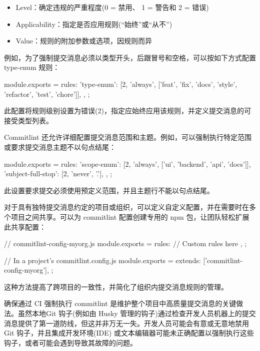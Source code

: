 \begin{itemize}
\item
Level：确定违规的严重程度(0 = 禁用、 1 = 警告和 2 = 错误)

\item
Applicability：指定是否应用规则(“始终”或“从不”)

\item
Value：规则的附加参数或选项，因规则而异
\end{itemize}

例如，为了强制提交消息必须以类型开头，后跟冒号和空格，可以按如下方式配置 type-enum 规则：

\begin{shell}
module.exports = {
    rules: {
        'type-enum': [2, 'always', ['feat', 'fix', 'docs', 'style',
        'refactor', 'test', 'chore']],
    },
};
\end{shell}

此配置将规则级别设置为错误(2)，指定应始终应用该规则，并定义提交消息的可接受类型列表。


Commitlint 还允许详细配置提交消息范围和主题。例如，可以强制执行特定范围或要求提交消息主题不以句点结尾：

\begin{shell}
module.exports = {
    rules: {
        'scope-enum': [2, 'always', ['ui', 'backend', 'api', 'docs']],
        'subject-full-stop': [2, 'never', '.'],
    },
};
\end{shell}

此设置要求提交必须使用预定义范围，并且主题行不能以句点结尾。


对于具有独特提交消息约定的项目或组织，可以定义自定义配置，并在需要时在多个项目之间共享。可以为 commitlint 配置创建专用的 npm 包，让团队轻松扩展此共享配置：

\begin{shell}
// commitlint-config-myorg.js
module.exports = {
    rules: {
        // Custom rules here
    },
};

// In a project's commitlint.config.js
module.exports = {
    extends: ['commitlint-config-myorg'],
};
\end{shell}

这种方法提高了跨项目的一致性，并简化了组织内提交消息规则的管理。


确保通过 CI 强制执行 commitlint 是维护整个项目中高质量提交消息的关键做法。虽然本地Git 钩子(例如由 Husky 管理的钩子)通过检查开发人员机器上的提交消息提供了第一道防线，但这并非万无一失。开发人员可能会有意或无意地禁用 Git 钩子，并且集成开发环境(IDE) 或文本编辑器可能未正确配置以强制执行这些钩子，或者可能会遇到导致其故障的问题。

